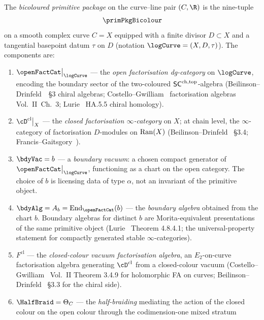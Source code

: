 \begin{definition}
\label{def:bicoloured-primitive-package}%
%
%
The \emph{bicoloured primitive package} on the curve--line pair
$(C, \R)$ is the nine-tuple
\[
 \primPkgBicolour
\]
on a smooth complex curve $C = X$ equipped with a finite divisor
$D \subset X$ and a tangential basepoint datum $\tau$ on $D$
(notation $\logCurve = (X, D, \tau)$). The components are:
\begin{enumerate}[label=\textup{(\roman*)},itemsep=2pt]
\item $\openFactCat\big|_{\logCurve}$ --- the \emph{open
 factorisation dg-category} on $\logCurve$, encoding the
 boundary sector of the two-coloured $\mathsf{SC}^{\mathrm{ch},\mathrm{top}}$-algebra
 (Beilinson--Drinfeld~\cite{BD04}~\S3 chiral algebras;
 Costello--Gwilliam~\cite{CG2017} factorisation algebras
 Vol.~II~Ch.~3; Lurie~\cite{LurieHA} HA.5.5 chiral homology).
\item $\cD^{\mathrm{cl}}\big|_{X}$ --- the \emph{closed
 factorisation $\infty$-category} on $X$; at chain level, the
 $\infty$-category of factorisation $D$-modules on
 $\mathrm{Ran}(X)$ (Beilinson--Drinfeld~\cite{BD04} \S3.4;
 Francis--Gaitsgory~\cite{FG12}).
\item $\bdyVac = b$ --- a \emph{boundary vacuum}: a chosen
 compact generator of $\openFactCat\big|_{\logCurve}$,
 functioning as a chart on the open category. The choice of $b$
 is licensing data of type $\alpha$, not an invariant of the
 primitive object.
\item $\bdyAlg = A_b = \mathrm{End}_{\openFactCat}(b)$ --- the
 \emph{boundary algebra} obtained from the chart $b$. Boundary
 algebras for distinct $b$ are Morita-equivalent presentations
 of the same primitive object (Lurie~\cite{LurieHA} Theorem
 4.8.4.1; the universal-property statement for compactly
 generated stable $\infty$-categories).
\item $F^{\mathrm{cl}}$ --- the \emph{closed-colour vacuum
 factorisation algebra}, an $E_2$-on-curve factorisation algebra
 generating $\cD^{\mathrm{cl}}$ from a closed-colour vacuum
 (Costello--Gwilliam~\cite{CG2017} Vol.~II Theorem 3.4.9 for
 holomorphic FA on curves; Beilinson--Drinfeld~\cite{BD04}
 \S3.3 for the chiral side).
\item $\HalfBraid = \Theta_C$ --- the \emph{half-braiding}
 mediating the action of the closed colour on the open
 colour through the codimension-one mixed stratum

\end{enumerate}
\end{definition}
